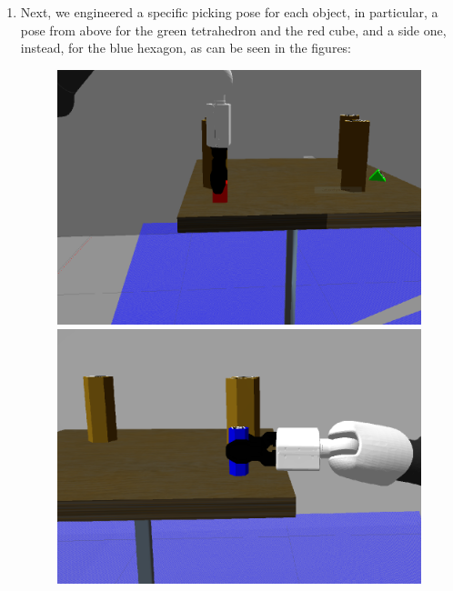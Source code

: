 \begin{enumerate}
    \item Next, we engineered a specific picking pose for each object, in particular, a pose from above for the green tetrahedron and the red cube, and a side one, instead, for the blue hexagon, as can be seen in the figures:    
    \begin{figure}[H]
        \begin{minipage}{0.33\textwidth}
            \centering
            \includegraphics[scale = 0.18]{images/manipulations/pick.png}
        \end{minipage}
        \begin{minipage}{0.33\textwidth}
            \centering
            \includegraphics[scale = 0.18]{images/manipulations/pickBlue.png}
        \end{minipage}

\end{figure}
\end{enumerate}
